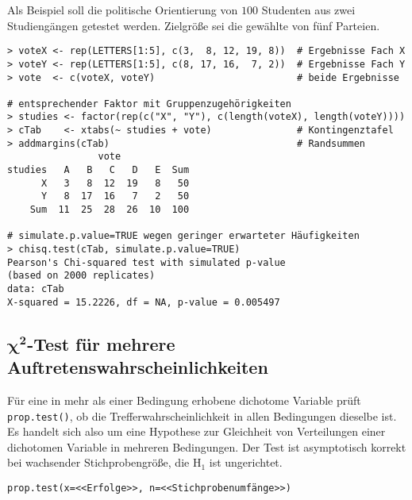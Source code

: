 Als Beispiel soll die politische Orientierung von $100$ Studenten aus zwei Studiengängen getestet werden. Zielgröße sei die gewählte von fünf Parteien.
\begin{lstlisting}
> voteX <- rep(LETTERS[1:5], c(3,  8, 12, 19, 8))  # Ergebnisse Fach X
> voteY <- rep(LETTERS[1:5], c(8, 17, 16,  7, 2))  # Ergebnisse Fach Y
> vote  <- c(voteX, voteY)                         # beide Ergebnisse

# entsprechender Faktor mit Gruppenzugehörigkeiten
> studies <- factor(rep(c("X", "Y"), c(length(voteX), length(voteY))))
> cTab    <- xtabs(~ studies + vote)               # Kontingenztafel
> addmargins(cTab)                                 # Randsummen
                vote
studies   A   B   C   D   E  Sum
      X   3   8  12  19   8   50
      Y   8  17  16   7   2   50
    Sum  11  25  28  26  10  100

# simulate.p.value=TRUE wegen geringer erwarteter Häufigkeiten
> chisq.test(cTab, simulate.p.value=TRUE)
Pearson's Chi-squared test with simulated p-value
(based on 2000 replicates)
data: cTab
X-squared = 15.2226, df = NA, p-value = 0.005497
\end{lstlisting}

\subsection[\texorpdfstring{$\chi^{2}$}{chi2}-Test für mehrere Auftretenswahrscheinlichkeiten]{$\bm{\chi^{2}}$-Test für mehrere Auftretenswahrscheinlichkeiten}
\label{sec:propTest}

Für eine in mehr als einer Bedingung erhobene dichotome Variable prüft \lstinline!prop.test()!, ob die Trefferwahrscheinlichkeit in allen Bedingungen dieselbe ist. Es handelt sich also um eine Hypothese zur Gleichheit von Verteilungen einer dichotomen Variable in mehreren Bedingungen. Der Test ist asymptotisch korrekt bei wachsender Stichprobengröße, die $\text{H}_{1}$ ist ungerichtet.
\begin{lstlisting}
prop.test(x=<<Erfolge>>, n=<<Stichprobenumfänge>>)
\end{lstlisting}

